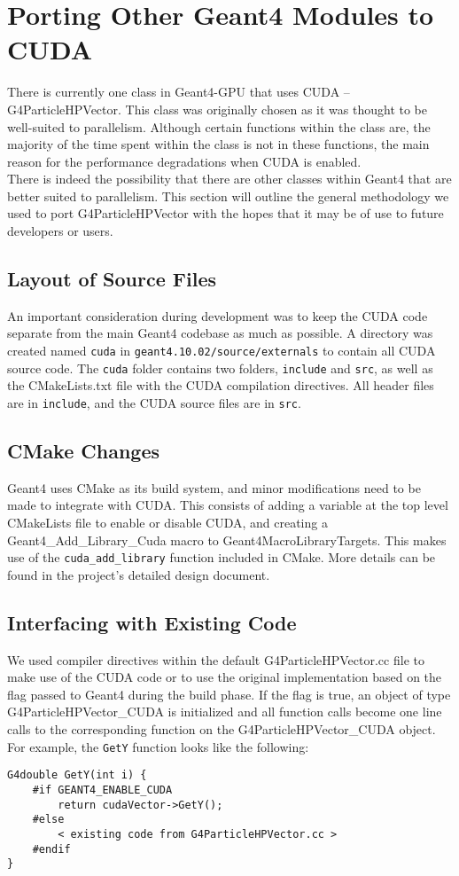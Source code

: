 \documentclass[12pt]{article}
\begin{document}
\section{Porting Other Geant4 Modules to CUDA} \label{SecDev} %
There is currently one class in Geant4-GPU that uses CUDA -- G4ParticleHPVector. This class was originally chosen as it was thought to be well-suited to parallelism. Although certain functions within the class are, the majority of the time spent within the class is not in these functions, the main reason for the performance degradations when CUDA is enabled.\\

There is indeed the possibility that there are other classes within Geant4 that are better suited to parallelism. This section will outline the general methodology we used to port G4ParticleHPVector with the hopes that it may be of use to future developers or users.

\subsection{Layout of Source Files} %
An important consideration during development was to keep the CUDA code separate from the main Geant4 codebase as much as possible. A directory was created named \texttt{cuda} in \texttt{geant4.10.02/source/externals} to contain all CUDA source code. The \texttt{cuda} folder contains two folders, \texttt{include} and \texttt{src}, as well as the CMakeLists.txt file with the CUDA compilation directives. All header files are in \texttt{include}, and the CUDA source files are in \texttt{src}.

\subsection{CMake Changes} %
Geant4 uses CMake as its build system, and minor modifications need to be made to integrate with CUDA. This consists of adding a variable at the top level CMakeLists file to enable or disable CUDA, and creating a {Geant4\_Add\_Library\_Cuda} macro to Geant4MacroLibraryTargets. This makes use of the \texttt{cuda\_add\_library} function included in CMake. More details can be found in the project's detailed design document.

\subsection{Interfacing with Existing Code} %
We used compiler directives within the default G4ParticleHPVector.cc file to make use of the CUDA code or to use the original implementation based on the flag passed to Geant4 during the build phase. If the flag is true, an object of type \\G4ParticleHPVector\_CUDA is initialized and all function calls become one line calls to the corresponding function on the G4ParticleHPVector\_CUDA object. For example, the \texttt{GetY} function looks like the following:
\begin{lstlisting}
G4double GetY(int i) {
	#if GEANT4_ENABLE_CUDA
		return cudaVector->GetY();
	#else
		< existing code from G4ParticleHPVector.cc >
	#endif
}
\end{lstlisting}
\end{document}
